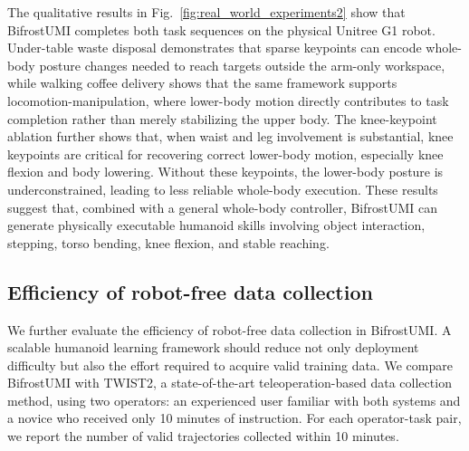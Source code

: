 \documentclass[letterpaper, 10 pt, conference]{ieeeconf}  %
\begin{document}
The qualitative results in Fig.~\ref{fig:real_world_experiments2} show that BifrostUMI completes both task sequences on the physical Unitree G1 robot. Under-table waste disposal demonstrates that sparse keypoints can encode whole-body posture changes needed to reach targets outside the arm-only workspace, while walking coffee delivery shows that the same framework supports locomotion-manipulation, where lower-body motion directly contributes to task completion rather than merely stabilizing the upper body. The knee-keypoint ablation further shows that, when waist and leg involvement is substantial, knee keypoints are critical for recovering correct lower-body motion, especially knee flexion and body lowering. Without these keypoints, the lower-body posture is underconstrained, leading to less reliable whole-body execution. These results suggest that, combined with a general whole-body controller, BifrostUMI can generate physically executable humanoid skills involving object interaction, stepping, torso bending, knee flexion, and stable reaching.

\subsection{Efficiency of robot-free data collection}

We further evaluate the efficiency of robot-free data collection in BifrostUMI. A scalable humanoid learning framework should reduce not only deployment difficulty but also the effort required to acquire valid training data. We compare BifrostUMI with TWIST2, a state-of-the-art teleoperation-based data collection method, using two operators: an experienced user familiar with both systems and a novice who received only 10 minutes of instruction. For each operator-task pair, we report the number of valid trajectories collected within 10 minutes.

\begin{table}[hbp]
    \centering
    \caption{
    Valid demonstration throughput of BifrostUMI and TWIST2 within 10 minutes.
    Speedup is computed per operator-task pair.
    }
    \label{tab:data_collection_efficiency}
\end{table}
\end{document}
